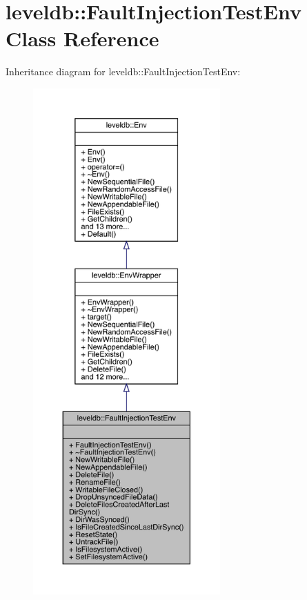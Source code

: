 \hypertarget{classleveldb_1_1_fault_injection_test_env}{}\section{leveldb\+::Fault\+Injection\+Test\+Env Class Reference}
\label{classleveldb_1_1_fault_injection_test_env}


Inheritance diagram for leveldb\+::Fault\+Injection\+Test\+Env\+:
\nopagebreak
\begin{figure}[H]
\begin{center}
\leavevmode
\includegraphics[height=550pt]{classleveldb_1_1_fault_injection_test_env__inherit__graph}
\end{center}
\end{figure}


